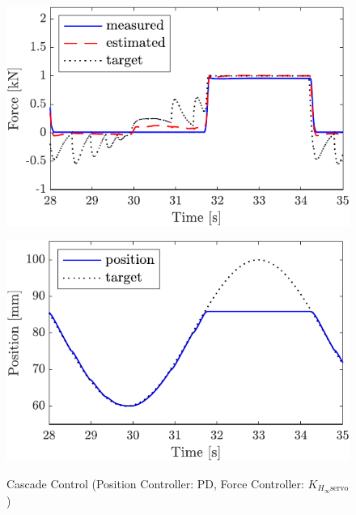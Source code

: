 \begin{figure}[t]
    \begin{minipage}{\minipageratio\hsize}
    \centering
        \includegraphics[keepaspectratio, scale = \minifigscale]{contents/IntegrationControl/figure/SECASQ/crop-FBcsqtch_JFPS4_Notrq_posPIDadjust_force.pdf}
        \label{fig5:crop-FBcsqtch_JFPS4_Notrq_posPIDadjust_force}
    \end{minipage}
    \begin{minipage}{\minipageratio\hsize}
    \centering
        \includegraphics[keepaspectratio, scale = \minifigscale]{contents/IntegrationControl/figure/SECASQ/crop-FBcsqtch_JFPS4_Notrq_posPIDadjust_pos.pdf}
        \label{fig5:crop-FBcsqtch_JFPS4_Notrq_posPIDadjust_pos}
    \end{minipage}
    \caption{Cascade Control (Position Controller: PD, Force Controller: $K_{H_\infty\mathrm{servo}}$)}  
    \label{fig5:crop-FBcsqtch_JFPS4_Notrq_posPIDadjust}
\end{figure}

